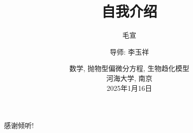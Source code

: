 \documentclass[10pt]{beamer}
\title{自我介绍}
\author{毛宣\inst{1}\and
    导师: 李玉祥\inst{1}}
\institute{
    \inst{1}东南大学数学学院
    }
\date{数学, 抛物型偏微分方程, 生物趋化模型 \\
    河海大学, 南京\\
    2025年1月16日
    }
\theoremstyle{remark}
\begin{document}
\begin{frame}
\end{frame}








%


%

\begin{frame}[standout]
    感谢倾听!
\end{frame} 
\end{document}
